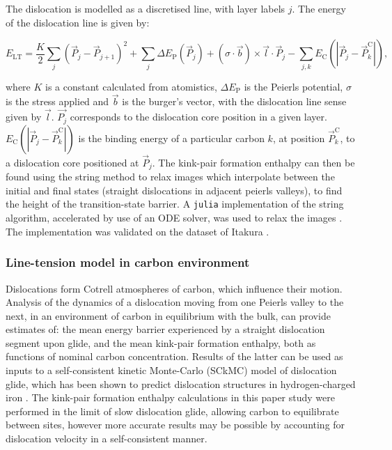 \documentclass[a4paper,11pt]{article}
\begin{document}
The dislocation is modelled as a discretised line, with layer labels \(j\). The energy of the
dislocation line is given by:

\[ E_{\text{LT}} = \frac{K}{2} \sum_j (\vec{P}_j - \vec{P}_{j+1} )^2  + \sum_j \Delta E_{\text{P}}  (\vec{P}_j) +
   (\sigma \cdot \vec{b}) \times \vec{l} \cdot \vec{P}_j  - \sum_{j,k} E_{\text{C}} (|\vec{P}_j-\vec{P}_k^{\text{C}}|), \label{eq:line-tension}\]

where \(K\) is a constant calculated from atomistics, \(\Delta E_{\text{P}}\) is the
Peierls potential, \(\sigma\) is the stress applied and \(\vec{b}\) is the burger's vector,
with the dislocation line sense given by \(\vec{l}\). \(\vec{P_{j}}\) corresponds to the
dislocation core position in a given layer. \(E_{\text{C}}
   (|\vec{P}_j-\vec{P}_k^{\text{C}}|)\) is the binding energy of a particular carbon \(k\),
at position \(\vec{P}_k^{\text{C}}\), to a dislocation core positioned at
\(\vec{P}_j\). The kink-pair formation enthalpy can then be found using the string method
to relax images which interpolate between the initial and final states (straight
dislocations in adjacent peierls valleys), to find the height of the transition-state
barrier. A \texttt{julia} implementation of the string algorithm, accelerated by use of an ODE
solver, was used to relax the images \cite{Makri2019}. The implementation was validated
on the dataset of Itakura \cite{Itakura2012}.



\subsubsection{Line-tension model in carbon environment}
\label{sec:org8729c13}

Dislocations form Cotrell atmospheres of carbon, which influence their
motion. Analysis of the dynamics of a dislocation moving from one Peierls
valley to the next, in an environment of carbon in equilibrium with the
bulk, can provide estimates of: the mean energy barrier experienced by a
straight dislocation segment upon glide, and the mean kink-pair formation
enthalpy, both as functions of nominal carbon concentration. Results of the latter
can be used as inputs to a self-consistent kinetic Monte-Carlo
(SCkMC) model of dislocation glide, which has been shown to predict
dislocation structures in hydrogen-charged iron \cite{Gong2020}. The kink-pair
formation enthalpy calculations in this paper study were performed in
the limit of slow dislocation glide, allowing carbon to equilibrate between
sites, however more accurate results may be possible by accounting for
dislocation velocity in a self-consistent manner.
\end{document}
